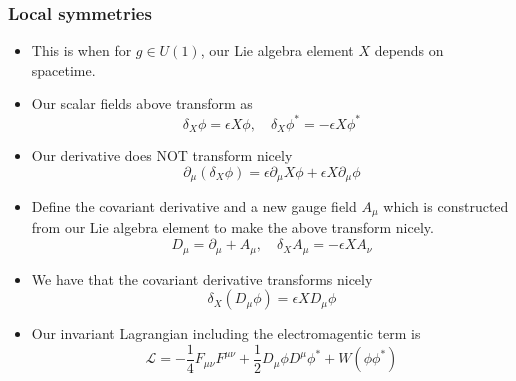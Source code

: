 \subsubsection*{Local symmetries}
\begin{itemize}
	\item This is when for $ g \in U ( 1 ) $, 
		our Lie algebra element  $ X $ depends 
		on spacetime. 
	\item Our scalar fields above transform as 
		\[
		 \delta _ X \phi  = \epsilon X \phi , \quad 
		 \delta _ X \phi ^  *  = - \epsilon X \phi ^ * 
		\] 
	\item Our derivative does NOT transform nicely 
		\[
			\partial  _ \mu \left( \delta _ X \phi   \right)  = 
			\epsilon \partial  _ \mu X \phi + \epsilon X \partial  _ \mu \phi 
		\] 
	\item Define the covariant derivative and a new gauge 
		field $A _ \mu $ which 
		is constructed from our Lie algebra element to make the above transform nicely. 
		\[
		 D_ \mu   = \partial  _ \mu  +A _ \mu , \quad 
		 \delta _ X A_ \mu   =  - \epsilon X A _ \nu 
		\] 
	\item We have that the covariant derivative 
		transforms nicely 
		\[
		 \delta _ X \left(  D _ \mu \phi  \right)   = 
		 \epsilon   X  D _ \mu  \phi 
		\] 
	\item Our invariant Lagrangian including the 
		electromagentic term is 
	\[
	 \mathcal{ L } =  -\frac{1}{4 } F _{ \mu \nu } F ^{ \mu\nu }
	  + \frac{1}{2 } D_ \mu \phi D ^{ \mu } \phi ^ * 
	  + W \left(  \phi \phi ^ *  \right) 
	\]  
\end{itemize}
\pagebreak 
